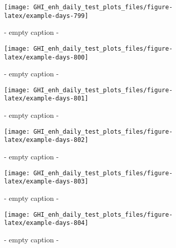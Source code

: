 \documentclass[
  10pt,
  a4paper,oneside]{article}
\begin{document}
\begin{figure}[H]

{\centering \texttt{[image: GHI\_enh\_daily\_test\_plots\_files/figure-latex/example-days-799]} 

}

\caption{ - empty caption - }\label{fig:example-days-799}
\end{figure}

\begin{figure}[H]

{\centering \texttt{[image: GHI\_enh\_daily\_test\_plots\_files/figure-latex/example-days-800]} 

}

\caption{ - empty caption - }\label{fig:example-days-800}
\end{figure}

\begin{figure}[H]

{\centering \texttt{[image: GHI\_enh\_daily\_test\_plots\_files/figure-latex/example-days-801]} 

}

\caption{ - empty caption - }\label{fig:example-days-801}
\end{figure}

\begin{figure}[H]

{\centering \texttt{[image: GHI\_enh\_daily\_test\_plots\_files/figure-latex/example-days-802]} 

}

\caption{ - empty caption - }\label{fig:example-days-802}
\end{figure}

\begin{figure}[H]

{\centering \texttt{[image: GHI\_enh\_daily\_test\_plots\_files/figure-latex/example-days-803]} 

}

\caption{ - empty caption - }\label{fig:example-days-803}
\end{figure}

\begin{figure}[H]

{\centering \texttt{[image: GHI\_enh\_daily\_test\_plots\_files/figure-latex/example-days-804]} 

}

\caption{ - empty caption - }\label{fig:example-days-804}
\end{figure}
\end{document}

